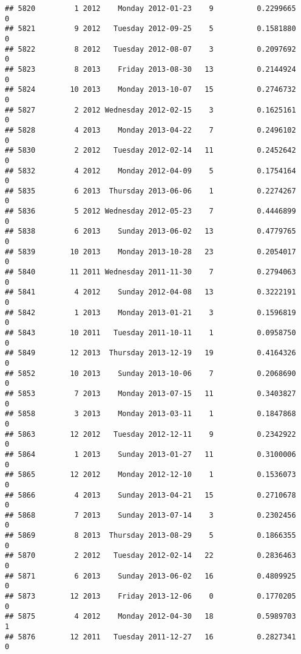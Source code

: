 \documentclass[
]{article}
\begin{document}
\begin{verbatim}
## 5820         1 2012    Monday 2012-01-23    9          0.2299665             0
## 5821         9 2012   Tuesday 2012-09-25    5          0.1581880             0
## 5822         8 2012   Tuesday 2012-08-07    3          0.2097692             0
## 5823         8 2013    Friday 2013-08-30   13          0.2144924             0
## 5824        10 2013    Monday 2013-10-07   15          0.2746732             0
## 5827         2 2012 Wednesday 2012-02-15    3          0.1625161             0
## 5828         4 2013    Monday 2013-04-22    7          0.2496102             0
## 5830         2 2012   Tuesday 2012-02-14   11          0.2452642             0
## 5832         4 2012    Monday 2012-04-09    5          0.1754164             0
## 5835         6 2013  Thursday 2013-06-06    1          0.2274267             0
## 5836         5 2012 Wednesday 2012-05-23    7          0.4446899             0
## 5838         6 2013    Sunday 2013-06-02   13          0.4779765             0
## 5839        10 2013    Monday 2013-10-28   23          0.2054017             0
## 5840        11 2011 Wednesday 2011-11-30    7          0.2794063             0
## 5841         4 2012    Sunday 2012-04-08   13          0.3222191             0
## 5842         1 2013    Monday 2013-01-21    3          0.1596819             0
## 5843        10 2011   Tuesday 2011-10-11    1          0.0958750             0
## 5849        12 2013  Thursday 2013-12-19   19          0.4164326             0
## 5852        10 2013    Sunday 2013-10-06    7          0.2068690             0
## 5853         7 2013    Monday 2013-07-15   11          0.3403827             0
## 5858         3 2013    Monday 2013-03-11    1          0.1847868             0
## 5863        12 2012   Tuesday 2012-12-11    9          0.2342922             0
## 5864         1 2013    Sunday 2013-01-27   11          0.3100006             0
## 5865        12 2012    Monday 2012-12-10    1          0.1536073             0
## 5866         4 2013    Sunday 2013-04-21   15          0.2710678             0
## 5868         7 2013    Sunday 2013-07-14    3          0.2302456             0
## 5869         8 2013  Thursday 2013-08-29    5          0.1866355             0
## 5870         2 2012   Tuesday 2012-02-14   22          0.2836463             0
## 5871         6 2013    Sunday 2013-06-02   16          0.4809925             0
## 5873        12 2013    Friday 2013-12-06    0          0.1770205             0
## 5875         4 2012    Monday 2012-04-30   18          0.5989703             1
## 5876        12 2011   Tuesday 2011-12-27   16          0.2827341             0

\end{verbatim}
\end{document}
